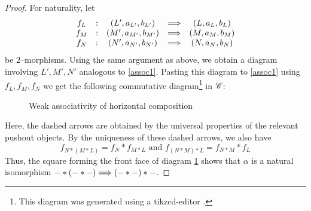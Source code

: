 \documentclass[./Thick_TQFTs_and_Quantum_Information.tex]{subfiles}
\begin{document}
\begin{proof}
For naturality, let
\[
\begin{array}{ccccc}
  f_L & : & (L', a_{L'}, b_{L'}) & \stackrel{}{\Longrightarrow} & (L, a_L, b_L) \\
  f_M & : & (M', a_{M'}, b_{M'}) & \stackrel{}{\Longrightarrow} & (M, a_M, b_M) \\
  f_N & : & (N', a_{N'}, b_{N'}) & \stackrel{}{\Longrightarrow} & (N, a_N, b_N)
\end{array}
\]
be $2$--morphisms. Using the same argument as above, we obtain a diagram
involving $L', M', N'$ analogous to \eqref{assoc1}. Pasting this diagram to
\eqref{assoc1} using $f_L, f_M, f_N$ we get the following commutative
diagram\footnote{This diagram was generated using a tikzcd-editor
\cite{tikzcdeditor}.} in $\mathscr{C}$:
\begin{figure}[H]\label{fig:glue_assoc}
  \begin{center}
  
  \end{center}
  \caption{Weak associativity of horizontal composition}
\end{figure}
Here, the dashed arrows are obtained by the universal properties of the relevant
pushout objects. By the uniqueness of these dashed arrows, we also have
\[
  f_{N * (M * L)} = f_N * f_{M * L}  \text{ and }
  f_{(N * M) * L} = f_{N * M} * f_L
\]
Thus, the square forming the front face of diagram \ref{fig:glue_assoc} shows
that $\alpha$ is a natural isomorphism
$- * (- * -) \stackrel{}{\Longrightarrow} (- * -) * -$.
\end{proof}
\end{document}
